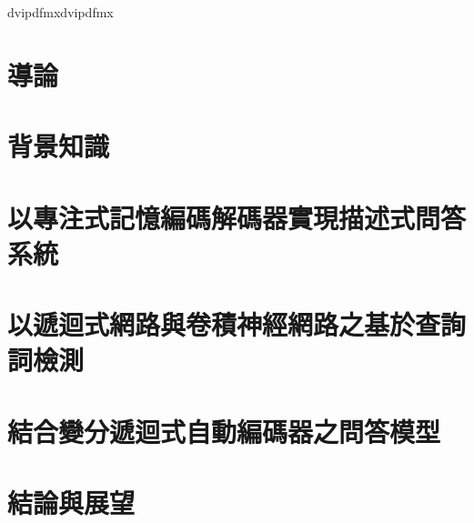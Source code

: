 \documentclass[12pt, a4paper]{ntuthesis}
\newcommand\mydvipdfmxflow{dvipdfmx}
\newcommand\myworkflow{dvipdfmx}  %
\newcommand\myworkflow{dvipdfmx}  %
\newcommand\myworkflow{pdftex}  %
\newcommand\myworkflow{dvipdfmx}  %
\begin{document}
\begin{CJK}{UTF8}{bsmi}   %

\ifx\myworkflow\mydvipdfmxflow
\fi

\CJKindent  %








\chapter{導論}
  
\chapter{背景知識}
  
%  
\chapter{以專注式記憶編碼解碼器實現描述式問答系統}
  
\chapter{以遞迴式網路與卷積神經網路之基於查詢詞檢測}
  
\chapter{結合變分遞迴式自動編碼器之問答模型}
  
\chapter{結論與展望}
  



\clearpage %
\end{CJK}  %
\end{document}
